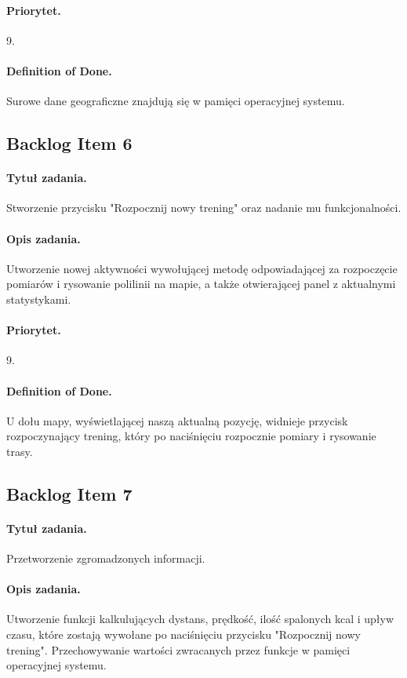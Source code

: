 \documentclass[a4paper]{article}
\begin{document}
\paragraph{Priorytet.} 9.
\paragraph{Definition of Done.} Surowe dane geograficzne znajdują się w pamięci operacyjnej systemu.

\subsection{Backlog Item 6}
\paragraph{Tytuł zadania.} Stworzenie przycisku "Rozpocznij nowy trening" oraz nadanie mu funkcjonalności.
\paragraph{Opis zadania.} Utworzenie nowej aktywności wywołującej metodę odpowiadającej za rozpoczęcie pomiarów i rysowanie polilinii na mapie, a także otwierającej panel z aktualnymi statystykami.
\paragraph{Priorytet.} 9.
\paragraph{Definition of Done.} U dołu mapy, wyświetlającej naszą aktualną pozycję, widnieje przycisk rozpoczynający trening, który po naciśnięciu rozpocznie pomiary i rysowanie trasy.

\subsection{Backlog Item 7}
\paragraph{Tytuł zadania.} Przetworzenie zgromadzonych informacji.
\paragraph{Opis zadania.} Utworzenie funkcji kalkulujących dystans, prędkość, ilość spalonych kcal i upływ czasu, które zostają wywołane po naciśnięciu przycisku "Rozpocznij nowy trening". Przechowywanie wartości zwracanych przez funkcje w pamięci operacyjnej systemu.
\end{document}

